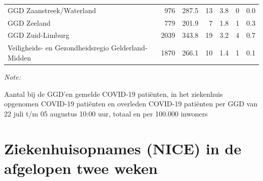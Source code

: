 \documentclass[
  english,
  man,floatsintext]{apa6}
\begin{document}
\begin{table}
\begin{threeparttable}
\begin{tabular}{lrrrrrr}
GGD Zaanstreek/Waterland & 976 & 287.5 & 13 & 3.8 & 0 & 0.0\\
GGD Zeeland & 779 & 201.9 & 7 & 1.8 & 1 & 0.3\\
GGD Zuid-Limburg & 2039 & 343.8 & 19 & 3.2 & 4 & 0.7\\
Veiligheids- en Gezondheidsregio Gelderland-Midden & 1870 & 266.1 & 10 & 1.4 & 1 & 0.1\\
\bottomrule
\end{tabular}
\begin{tablenotes}
\item \textit{Note: } 
\item Aantal bij de GGD’en gemelde COVID-19 patiënten, in het ziekenhuis opgenomen COVID-19 patiënten en overleden COVID-19 patiënten per GGD van 22 juli t/m 05 augustus 10:00 uur, totaal en per 100.000 inwoners
\end{tablenotes}
\end{threeparttable}
\endgroup{}
\end{table}

\newpage

\hypertarget{ziekenhuisopnames-nice-in-de-afgelopen-twee-weken}{%
\section{Ziekenhuisopnames (NICE) in de afgelopen twee weken}\label{ziekenhuisopnames-nice-in-de-afgelopen-twee-weken}}
\end{document}
